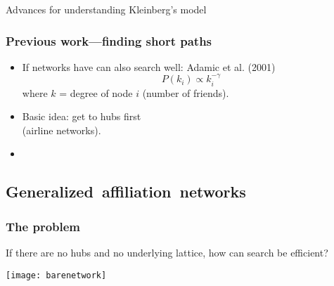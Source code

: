 \begin{frame}

  \begin{block}{Advances for understanding Kleinberg's model}



    
  \end{block}


\end{frame}

\begin{frame}
  \frametitle{Previous work---finding short paths}

  \begin{block}{}
    \begin{itemize}
    \item<1-> 
      If networks have  can 
      also search well: Adamic et al. (2001)\cite{adamic2001a}
      $$ P(k_i) \propto k_i^{-\gamma}$$
      where $k$ = degree of node $i$ (number of friends).
    \item<2->
      Basic idea: get to hubs first\\
      (airline networks).
    \item<3->   
    \end{itemize}
  \end{block}
  
\end{frame}

\subsection{Generalized\ affiliation\ networks}

\begin{frame}
  \frametitle{The problem}

  \begin{block}{}
  If there are no hubs and no underlying lattice,
  how can search be efficient?

  \texttt{[image: barenetwork]}%
  \end{block}

\end{frame}


